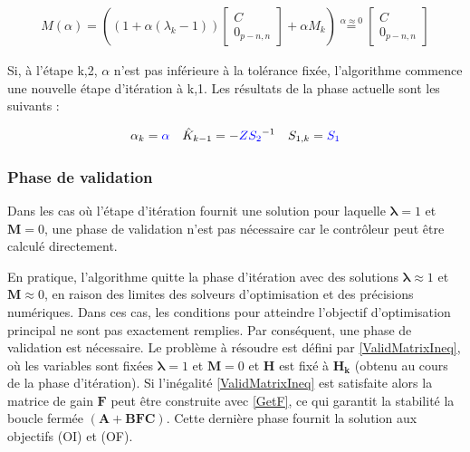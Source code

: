 \begin{equation}
    \begin{gathered}
        \hat{M}(\alpha) = \left((1+\alpha (\lambda_k-1))
        \begin{bmatrix}
            C \\
            0_{p-n,n}
        \end{bmatrix}
        + 
        \alpha M_k\right)
        \stackrel{\alpha \approx 0 }{=}
        \begin{bmatrix}
            C \\
            0_{p-n,n}
        \end{bmatrix}
    \end{gathered}
    \label{Artificiu3}
\end{equation}

Si, à l'étape k,2, $\alpha$ n'est pas inférieure à la tolérance fixée, l'algorithme commence une nouvelle étape d'itération à k,1. Les résultats de la phase actuelle sont les suivants :

\begin{equation}
    \begin{gathered}
\alpha_k=\textcolor{blue}{\alpha}  \quad
        \hat{K}_{k-1} = -\textcolor{blue}{Z} \textcolor{blue}{S_2}^{-1} \quad
        S_{1,k} = \textcolor{blue}{S_1}
    \end{gathered}
    \label{OutputsIterStap1}
\end{equation}

\subsubsection{Phase de validation}
Dans les cas où l'étape d'itération fournit une solution pour laquelle $\boldsymbol{\lambda} = 1 $ et $\boldsymbol{M} = 0$, une phase de validation n'est pas nécessaire car le contrôleur peut être calculé directement. 

En pratique, l'algorithme quitte la phase d'itération avec des solutions $\boldsymbol{\lambda} \approx 1$ et $\boldsymbol{M} \approx 0$, en raison des limites des solveurs d'optimisation et des précisions numériques. Dans ces cas, les conditions pour atteindre l'objectif d'optimisation principal ne sont pas exactement remplies. Par conséquent, une phase de validation est nécessaire. Le problème à résoudre est défini par \eqref{ValidMatrixIneq}, où les variables sont fixées $\boldsymbol{\lambda} = 1$ et $\boldsymbol{M} = 0$ et $\boldsymbol{H}$ est fixé à $\boldsymbol{H_k}$ (obtenu au cours de la phase d'itération).
Si l'inégalité \eqref{ValidMatrixIneq} est satisfaite alors la matrice de gain $\boldsymbol{F}$ peut être construite avec \eqref{GetF}, ce qui garantit la stabilité la boucle fermée $(\boldsymbol{A}+\boldsymbol{B}\boldsymbol{F}\boldsymbol{C})$. Cette dernière phase fournit la solution aux objectifs (OI) et (OF). 

